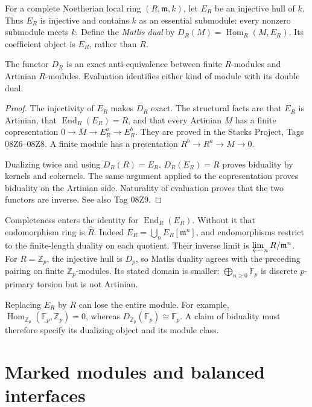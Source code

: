 For a complete Noetherian local ring $(R,\mathfrak m,k)$, let $E_R$
be an injective hull of $k$. Thus $E_R$ is injective and contains
$k$ as an essential submodule: every nonzero submodule meets $k$.
Define the \emph{Matlis dual} by
$D_R(M)=\operatorname{Hom}_R(M,E_R)$.
Its coefficient object is $E_R$, rather than $R$.

\begin{theorem}
\label{v4-arith:md:thm:matlis}
The functor $D_R$ is an exact anti-equivalence between finite
$R$-modules and Artinian $R$-modules. Evaluation identifies either
kind of module with its double dual.
\end{theorem}

\begin{proof}
The injectivity of $E_R$ makes $D_R$ exact. The structural facts
are that $E_R$ is Artinian, that $\operatorname{End}_R(E_R)=R$,
and that every Artinian $M$ has a finite copresentation
$0\to M\to E_R^a\to E_R^b$. They are proved in the Stacks Project,
Tags 08Z6--08Z8. A finite module has a presentation
$R^b\to R^a\to M\to0$.

Dualizing twice and using
$D_R(R)=E_R$, $D_R(E_R)=R$ proves biduality by kernels and
cokernels. The same argument applied to the copresentation proves
biduality on the Artinian side. Naturality of evaluation proves
that the two functors are inverse. See also Tag 08Z9.
\end{proof}

Completeness enters the identity for $\operatorname{End}_R(E_R)$.
Without it that endomorphism ring is $\widehat R$. Indeed
$E_R=\bigcup_nE_R[\mathfrak m^n]$, and endomorphisms restrict to
the finite-length duality on each quotient. Their inverse limit is
$\varprojlim_nR/\mathfrak m^n$.
For $R=\mathbb Z_p$, the injective hull is $D_p$, so Matlis duality
agrees with the preceding pairing on finite $\mathbb Z_p$-modules.
Its stated domain is smaller: $\bigoplus_{n\geq0}\mathbb F_p$
is discrete $p$-primary torsion but is not Artinian.

Replacing $E_R$ by $R$ can lose the entire module. For example,
$\operatorname{Hom}_{\mathbb Z_p}(\mathbb F_p,\mathbb Z_p)=0$,
whereas $D_{\mathbb Z_p}(\mathbb F_p)\cong\mathbb F_p$.
A claim of biduality must therefore specify its dualizing object
and its module class.

\section{Marked modules and balanced interfaces}
\label{v4-arith:md:sec:marked}

